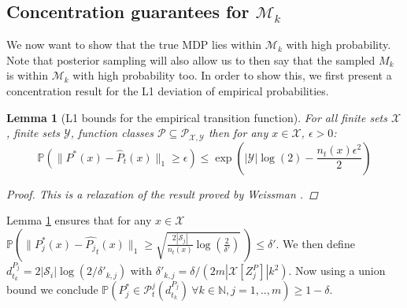 \documentclass{article}
\newtheorem{lemma}{Lemma}
\newcommand{\Exp}{\mathds{E}}
\newcommand{\Prob}{\mathds{P}}
\newcommand{\Real}{\mathds{R}}
\newcommand{\Nat}{\mathbb{N}}
\newcommand{\Xc}{\mathcal{X}}
\newcommand{\Yc}{\mathcal{Y}}
\newcommand{\Pc}{\mathcal{P}}
\newcommand{\Sc}{\mathcal{S}}
\newcommand{\Mc}{\mathcal{M}}
\begin{document}
\subsection{Concentration guarantees for $\Mc_k$}
We now want to show that the true MDP lies within $\Mc_k$ with high probability.
Note that posterior sampling will also allow us to then say that the sampled $M_k$ is within $\Mc_k$ with high probability too.
In order to show this, we first present a concentration result for the L1 deviation of empirical probabilities.

\begin{lemma}[L1 bounds for the empirical transition function]
\label{lem: weissman} \hspace{0.000000001mm} \newline
For all finite sets $\Xc$, finite sets $\Yc$, function classes $\Pc \subseteq \Pc_{\Xc,\Yc}$ then for any $x \in \Xc$, $\epsilon > 0$:
\begin{equation*}
	\Prob \left( \| P^*(x) - \hat{P}_t(x) \|_1 \ge \epsilon \right) \le \exp \left( |\Yc| \log(2) - \frac{n_t(x) \epsilon^2}{2} \right)
\end{equation*}
\begin{proof}
This is a relaxation of the result proved by Weissman \cite{weissman2003inequalities}.
\end{proof}
\end{lemma}
Lemma \ref{lem: weissman} ensures that for any $x \in \Xc$
$\Prob \left( \| P_j^*(x) - \hat{P_j}_t(x) \|_{1} \ge \sqrt{\frac{2 | \Sc_j |}{n_t(x)}\log\left( \frac{2}{\delta'} \right)} \ \right) \le \delta'$.
We then define $d^{P_j}_{t_k} = 2 | \Sc_i | \log\left( 2/ \delta'_{k,j} \right)$ with $\delta'_{k,j} = \delta / (2 m | \Xc[Z^P_j] | k^2)$.
Now using a union bound we conclude %
$\Prob \left( P^*_j \in \Pc^j_t(d_{t_k}^{P_j}) \ \forall k \in \Nat,j=1,..,m  \right) \ge 1 - \delta $.

\end{document}
